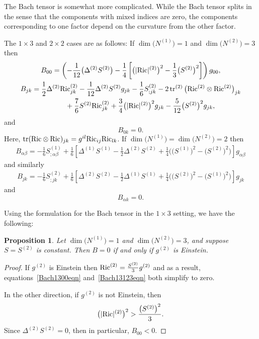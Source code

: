 \documentclass[pdftex]{sigma}
\numberwithin{equation}{section}
\newtheorem{Proposition}[Theorem]{Proposition}
 { \theoremstyle{definition}
\newtheorem{Definition}[Theorem]{Definition}
\newtheorem{Example}[Theorem]{Example}
\newtheorem{Remark}[Theorem]{Remark} }
\newcommand{\tr}{\operatorname{tr}} %
\begin{document}
The Bach tensor is somewhat more complicated. While the Bach tensor splits in the sense that the components with mixed indices are zero, the components corresponding to one factor depend on the curvature from the other factor.

The $1 \times 3$ and $2 \times 2$ cases are as follows: If $\dim\big(N^{(1)}\big) = 1$ and $\dim\big(N^{(2)}\big) = 3$ then
\begin{gather} \label{Bach1300eqn}
B_{00} = \left(-\frac{1}{12}\big(\Delta^{(2)} S^{(2)}\big)
		- \frac{1}{4}\left[ \big(|{\rm Ric}|^{(2)}\big)^2 - \frac{1}{3}\big(S^{(2)}\big)^2 \right] \right) g_{00},\\
B_{jk} = \frac{1}{2} \Delta^{(2)} {\rm Ric}^{(2)}_{jk}
				- \frac{1}{12} \Delta^{(2)} S^{(2)} g_{jk}
				- \frac{1}{6} S^{(2)}_{;jk}
			 - 2 \tr^{(2)}\big({\rm Ric}^{(2)} \otimes {\rm Ric}^{(2)}\big)_{jk}\nonumber\\
\hphantom{B_{jk} =}{}
				+ \frac{7}{6} S^{(2)} {\rm Ric}^{(2)}_{jk}
+ \frac{3}{4} \big(|{\rm Ric}|^{(2)}\big)^2 g_{jk}
				- \frac{5}{12} \big(S^{(2)}\big)^2 g_{jk},\label{Bach13123eqn}
\end{gather}
and
\[
B_{0 k} = 0.
\]
Here, $\tr({\rm Ric} \otimes {\rm Ric})_{jk} = g^{il} {\rm Ric}_{ij} {\rm Ric}_{lk}$. If $\dim\big(N^{(1)}\big) = \dim\big(N^{(2)}\big) = 2$ then
\begin{gather} \label{Bach22eqn1}
B_{\alpha \beta} = -\frac{1}{6} S^{(1)}_{;\alpha \beta}
		+ \frac{1}{6} \left[\Delta^{(1)} S^{(1)} - \frac{1}{2} \Delta^{(2)} S^{(2)}
						+ \frac{1}{4} \big(\big(S^{(1)}\big)^2 - \big(S^{(2)}\big)^2 \big) \right] g_{\alpha \beta}
\end{gather}
and similarly
\begin{gather} \label{Bach22eqn2}
B_{jk} = -\frac{1}{6} S^{(2)}_{;jk}
		+ \frac{1}{6} \left[\Delta^{(2)} S^{(2)} - \frac{1}{2} \Delta^{(1)} S^{(1)}
								+ \frac{1}{4} \big(\big(S^{(2)}\big)^2 - \big(S^{(1)}\big)^2 \big) \right] g_{jk}
\end{gather}
and
\[
B_{\alpha k} = 0.
\]

Using the formulation for the Bach tensor in the $1 \times 3$ setting, we have the following:

\begin{Proposition} \label{EinsteinSliceprop}
Let $\dim\big(N^{(1)}\big) = 1$ and $\dim\big(N^{(2)}\big) = 3$, and suppose $S = S^{(2)}$ is constant. Then $B = 0$ if and only if $g^{(2)}$ is Einstein.
\end{Proposition}

\begin{proof}If $g^{(2)}$ is Einstein then ${\rm Ric}^{(2)} = \frac{S^{(2)}}{3} g^{(2)}$ and as a result, equations~\eqref{Bach1300eqn} and~\eqref{Bach13123eqn} both simplify to zero.

In the other direction, if $g^{(2)}$ is not Einstein, then
\[
\big(|{\rm Ric}|^{(2)}\big)^2 > \frac{\big(S^{(2)}\big)^2}{3}.
\]
Since $\Delta^{(2)} S^{(2)} = 0$, then in particular, $B_{00} < 0$.
\end{proof}
\end{document}
